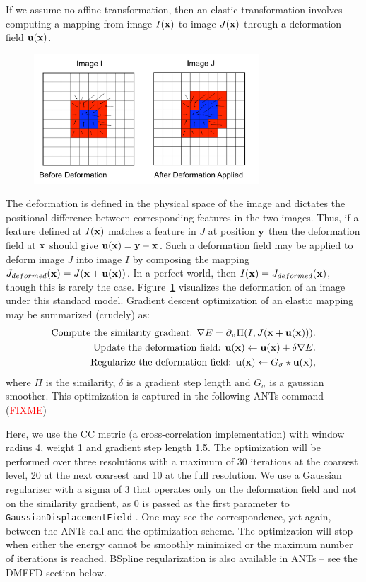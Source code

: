 \documentclass{InsightArticle}
\newcommand{\x}{{\bf x}}
\newcommand{\y}{{\bf y}}
\newcommand{\disp}{{\bf u}}
\begin{document}
 If we assume no affine transformation, then 
an elastic transformation involves computing a mapping from image $I(\x)$ to image $J(\x)$ 
through a deformation field $\disp( \x )$.  
\begin{figure}
\center \includegraphics[width=0.75\textwidth]{./Figures/PullBack.pdf} 
\label{fig:pull}
\end{figure}  
The deformation is defined in the physical space of the image 
and dictates the positional difference between corresponding features in the two images.  
Thus, if a feature defined at $I(\x)$ matches a feature in $J$ at position $\y$ then the deformation 
field at $\x$ should give $\disp ( \x )=\y-\x$.   
Such a deformation field may be applied to deform 
image $J$ into image $I$ by composing the mapping $J_{deformed}(\x)=J(\x+\disp(\x))$.  
In a perfect world, then $I(\x)=J_{deformed}(\x)$, though this is rarely the case.  Figure~\ref{fig:pull} 
visualizes the deformation of an image under this standard model. 
Gradient descent optimization of an elastic mapping may be summarized (crudely) as: 
\begin{align}
\text{Compute the similarity gradient:   }  \nabla E = \partial_{\disp} \Pi(I,J(\x+\disp(\x))). \nonumber \\
\text{Update the deformation field:  }  \disp(\x) \leftarrow \disp(\x)+\delta \nabla E. \nonumber \\ 
\text{Regularize the deformation field:  }  \disp(\x) \leftarrow G_\sigma \star \disp(\x),
\end{align}
where $\Pi$ is the similarity, $\delta$ is a gradient step length and $G_\sigma$ is a gaussian smoother.
This optimization is captured in the following ANTs command (\textcolor{red}{FIXME})

Here, we use the CC metric (a cross-correlation implementation) with
window radius 4, weight 1 and gradient step length 1.5.  The
optimization will be performed over three resolutions with a maximum
of 30 iterations at the coarsest level, 20 at the next coarsest and 10
at the full resolution.  We use a Gaussian regularizer with a sigma of
3 that operates only on the deformation field and not on the similarity gradient, as 
0 is passed as the first parameter to \texttt{GaussianDisplacementField} .  One may see the
correspondence, yet again, between the ANTs call and the optimization
scheme.  The optimization will stop when either the energy cannot be 
smoothly minimized or the maximum number of iterations is reached. 
BSpline regularization is also available in ANTs -- see the DMFFD 
section below.  
\end{document}
